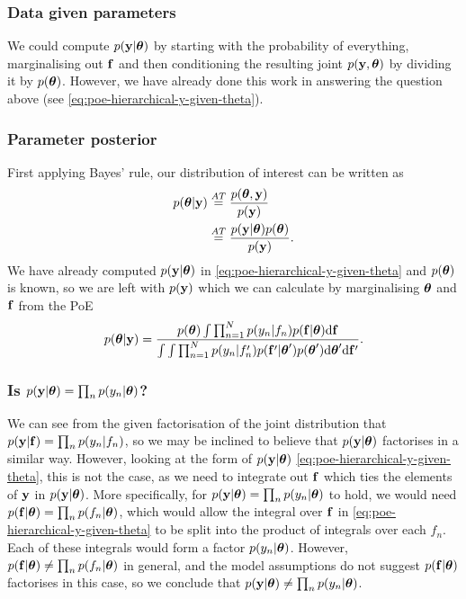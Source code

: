 \documentclass[a4paper]{article}
\theoremstyle{definition}
\begin{document}
\subsubsection{Data given parameters}
We could compute $p(\mathbf{y} | \boldsymbol{\theta} )$ by starting with the probability of everything, marginalising out $\mathbf{f}$ and then conditioning the resulting joint $p( \mathbf{y}, \boldsymbol{\theta} )$ by dividing it by $p( \boldsymbol{\theta} )$. However, we have already done this work in answering the question above (see \eqref{eq:poe-hierarchical-y-given-theta}).

\subsubsection{Parameter posterior}
First applying Bayes' rule, our distribution of interest can be written as
\begin{align}
p( \boldsymbol{\theta} | \mathbf{y} ) &\stackrel{AT}{=} \frac{ p( \boldsymbol{\theta}, \mathbf{y} ) }{ p( \mathbf{y} ) } \\
&\stackrel{AT}{=} \frac{ p( \mathbf{y} | \boldsymbol{\theta} )p( \boldsymbol{\theta} ) }{ p( \mathbf{y} ) }.
\end{align}
We have already computed $p( \mathbf{y} | \boldsymbol{\theta} )$ in \eqref{eq:poe-hierarchical-y-given-theta} and $p( \boldsymbol{\theta} )$ is known, so we are left with $p( \mathbf{y} )$ which we can calculate by marginalising $\boldsymbol{\theta}$ and $\mathbf{f}$ from the PoE
\begin{align}
p( \boldsymbol{\theta} | \mathbf{y} ) = \frac{ p( \boldsymbol{\theta} ) \int \prod_{n=1}^N p(y_n | f_n) p(\mathbf{f} | \boldsymbol{\theta})  \mathrm{d}\mathbf{f} }{ \int \int \prod_{n=1}^N p(y_n | f_n') p(\mathbf{f}' | \boldsymbol{\theta}') p(\boldsymbol{\theta}') \mathrm{d}\boldsymbol{\theta}' \mathrm{d}\mathbf{f}' }.
\end{align}

\subsubsection{Is $p(\mathbf{y} | \boldsymbol{\theta} ) = \prod_n p( y_n | \boldsymbol{\theta} )$?}
We can see from the given factorisation of the joint distribution that $p( \mathbf{y} | \mathbf{f} )=\prod_n p( y_n | f_n )$, so we may be inclined to believe that $p( \mathbf{y} | \boldsymbol{\theta} )$ factorises in a similar way. However, looking at the form of $p( \mathbf{y} | \boldsymbol{\theta} )$ \eqref{eq:poe-hierarchical-y-given-theta}, this is not the case, as we need to integrate out $\mathbf{f}$ which ties the elements of $\mathbf{y}$ in $p( \mathbf{y} | \boldsymbol{\theta} )$. More specifically, for $p(\mathbf{y} | \boldsymbol{\theta} ) = \prod_n p( y_n | \boldsymbol{\theta} )$ to hold, we would need $p( \mathbf{f} | \boldsymbol{\theta} ) = \prod_n p( f_n | \boldsymbol{\theta})$, which would allow the integral over $\mathbf{f}$ in \eqref{eq:poe-hierarchical-y-given-theta} to be split into the product of integrals over each $f_n$. Each of these integrals would form a factor $p( y_n | \boldsymbol{\theta} )$. However, $p( \mathbf{f} | \boldsymbol{\theta} ) \neq \prod_n p( f_n | \boldsymbol{\theta})$ in general, and the model assumptions do not suggest $p( \mathbf{f} | \boldsymbol{\theta} )$ factorises in this case, so we conclude that $p(\mathbf{y} | \boldsymbol{\theta} ) \neq \prod_n p( y_n | \boldsymbol{\theta} )$.
\end{document}
